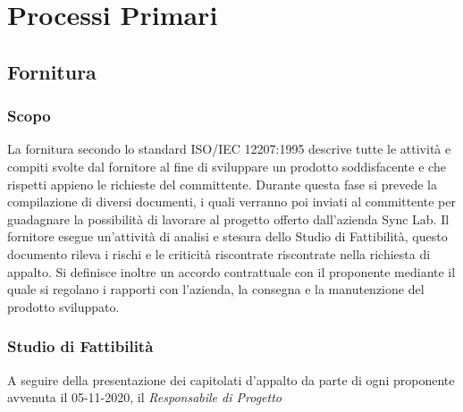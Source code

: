 \chapter{Processi Primari}
\section{Fornitura}
\subsection{Scopo}
La fornitura secondo lo standard ISO/IEC 12207:1995 descrive tutte le attività e compiti svolte dal fornitore al fine di sviluppare un prodotto soddisfacente e che rispetti appieno le richieste del committente.
Durante questa fase si prevede la compilazione di diversi documenti, i quali verranno poi inviati al committente per guadagnare la possibilità di lavorare al progetto offerto dall'azienda Sync Lab.
Il fornitore esegue un'attività di analisi e stesura dello Studio di Fattibilità, questo documento rileva i rischi e le criticità riscontrate riscontrate nella richiesta di appalto.
Si definisce inoltre un accordo contrattuale con il proponente mediante il quale si regolano i rapporti con l'azienda, la consegna e la manutenzione del prodotto sviluppato. 

\subsection{Studio di Fattibilità}
A seguire della presentazione dei capitolati d'appalto da parte di ogni proponente avvenuta il 05-11-2020, il \emph{Responsabile di Progetto} 